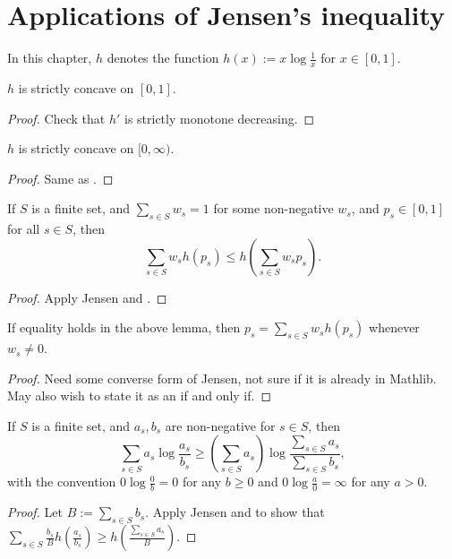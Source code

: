 \chapter{Applications of Jensen's inequality}

In this chapter, $h$ denotes the function $h(x) := x \log \frac{1}{x}$ for $x \in [0,1]$.

\begin{lemma}[Concavity]\label{concave}
  \leanok
  $h$ is strictly concave on $[0,1]$.
\end{lemma}

\begin{proof} \leanok Check that $h'$ is strictly monotone decreasing.
\end{proof}

\begin{lemma}[Concavity]\label{concave-general}
  $h$ is strictly concave on $[0,\infty)$.
\end{lemma}
\begin{proof}
Same as .
\end{proof}


\begin{lemma}[Jensen]\label{jensen}
   \leanok
  If $S$ is a finite set, and $\sum_{s \in S} w_s = 1$ for some non-negative $w_s$, and $p_s \in [0,1]$ for all $s \in S$, then
  $$ \sum_{s \in S} w_s h(p_s) \leq h(\sum_{s \in S} w_s p_s).$$
\end{lemma}

\begin{proof} \leanok Apply Jensen and .
\end{proof}

\begin{lemma}\label{converse-jensen}
  \leanok
If equality holds in the above lemma, then $p_s = \sum_{s \in S} w_s h(p_s)$ whenever $w_s \neq 0$.
\end{lemma}

\begin{proof} \leanok Need some converse form of Jensen, not sure if it is already in Mathlib.  May also wish to state it as an if and only if.
\end{proof}

\begin{lemma}
  \label{log-sum}
  If $S$ is a finite set, and $a_s,b_s$ are non-negative for $s\in S$, then 
  $$\sum_{s\in S} a_s \log\frac{a_s}{b_s}\ge \left(\sum_{s\in S}a_s\right)\log\frac{\sum_{s\in S} a_s}{\sum_{s\in S} b_s},$$
  with the convention $0\log\frac{0}{b}=0$ for any $b\ge 0$ and $0\log\frac{a}{0}=\infty$ for any $a>0$.
\end{lemma}
\begin{proof}
  Let $B:=\sum_{s\in S} b_s$. Apply Jensen and  to show that $\sum_{s\in S} \frac{b_s}{B} h(\frac{a_s}{b_s})\ge h(\frac{\sum_{s\in S} a_s}{B})$.
\end{proof}

